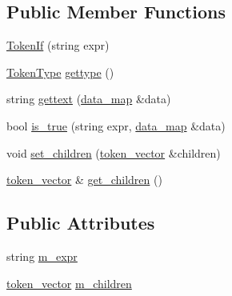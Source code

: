 \subsection*{Public Member Functions}
\begin{DoxyCompactItemize}
\item 
\hyperlink{classxtd_1_1network_1_1http_1_1cpptempl_1_1TokenIf_a85507707011ac1fadff757c738600fa8}{Token\-If} (string expr)
\item 
\hyperlink{namespacextd_1_1network_1_1http_1_1cpptempl_a39833083d228a5b5ef9f6bb7896479ee}{Token\-Type} \hyperlink{classxtd_1_1network_1_1http_1_1cpptempl_1_1TokenIf_a8f79f4e2ee4ea4eca0ff1730679a28d3}{gettype} ()
\item 
string \hyperlink{classxtd_1_1network_1_1http_1_1cpptempl_1_1TokenIf_a326aa566357136e9c331be938442176d}{gettext} (\hyperlink{namespacextd_1_1network_1_1http_1_1cpptempl_a638d1d81c8fb63c0bbafd508d6a2a007}{data\-\_\-map} \&data)
\item 
bool \hyperlink{classxtd_1_1network_1_1http_1_1cpptempl_1_1TokenIf_aa803ceac00459d9ceae20b64e4e366e7}{is\-\_\-true} (string expr, \hyperlink{namespacextd_1_1network_1_1http_1_1cpptempl_a638d1d81c8fb63c0bbafd508d6a2a007}{data\-\_\-map} \&data)
\item 
void \hyperlink{classxtd_1_1network_1_1http_1_1cpptempl_1_1TokenIf_ab88a2991518e79ec41c90372c4153210}{set\-\_\-children} (\hyperlink{namespacextd_1_1network_1_1http_1_1cpptempl_a38606cfbbfe81ed46ea9b0cf064de956}{token\-\_\-vector} \&children)
\item 
\hyperlink{namespacextd_1_1network_1_1http_1_1cpptempl_a38606cfbbfe81ed46ea9b0cf064de956}{token\-\_\-vector} \& \hyperlink{classxtd_1_1network_1_1http_1_1cpptempl_1_1TokenIf_ad289850734bbb131bfef741a80664e31}{get\-\_\-children} ()
\end{DoxyCompactItemize}
\subsection*{Public Attributes}
\begin{DoxyCompactItemize}
\item 
string \hyperlink{classxtd_1_1network_1_1http_1_1cpptempl_1_1TokenIf_a1d1181e1717358dd9e1a37387dfd5454}{m\-\_\-expr}
\item 
\hyperlink{namespacextd_1_1network_1_1http_1_1cpptempl_a38606cfbbfe81ed46ea9b0cf064de956}{token\-\_\-vector} \hyperlink{classxtd_1_1network_1_1http_1_1cpptempl_1_1TokenIf_afeb13fbde7fb87c9f6321c0c8042e25b}{m\-\_\-children}
\end{DoxyCompactItemize}


